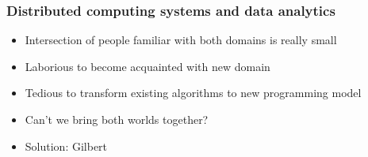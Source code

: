\begin{frame}
	\frametitle{Distributed computing systems and data analytics}
	\begin{itemize}
		\item Intersection of people familiar with both domains is really small
		\item Laborious to become acquainted with new domain
		\item Tedious to transform existing algorithms to new programming model
		\item Can't we bring both worlds together?
		\item Solution: Gilbert
	\end{itemize}
\end{frame}